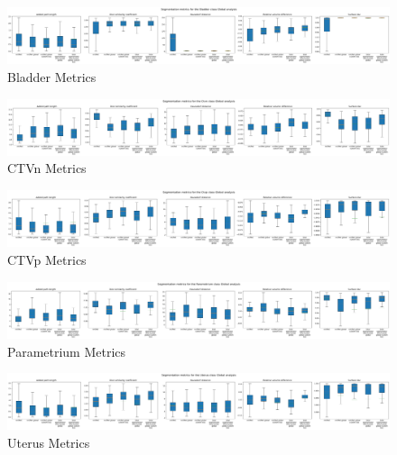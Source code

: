 \documentclass[12pt,twoside]{report}
\begin{document}
\begin{landscape}
  \begin{figure}[H]
    \centering
    \includegraphics[width=\linewidth]{../../research/source/code/data/metrics/metricsbladder_1_combinednotable_Global_analysis.png}
    \caption{Bladder Metrics}\label{fig:region-based-metrics-bladder}
  \end{figure}

  \begin{figure}[H]
    \centering
    \includegraphics[width=\linewidth]{../../research/source/code/data/metrics/metricsctvn_1_combinednotable_Global_analysis.png}
    \caption{CTVn Metrics}\label{fig:region-based-metrics-ctvn}
  \end{figure}

  \begin{figure}[H]
    \centering
    \includegraphics[width=\linewidth]{../../research/source/code/data/metrics/metricsctvp_1_combinednotable_Global_analysis.png}
    \caption{CTVp Metrics}\label{fig:region-based-metrics-ctvp}
  \end{figure}

  \begin{figure}[H]
    \centering
    \includegraphics[width=\linewidth]{../../research/source/code/data/metrics/metricsparametrium_1_combinednotable_Global_analysis.png}
    \caption{Parametrium Metrics}\label{fig:region-based-metrics-parametrium}
  \end{figure}

  \begin{figure}[H]
    \centering
    \includegraphics[width=\linewidth]{../../research/source/code/data/metrics/metricsuterus_1_combinednotable_Global_analysis.png}
    \caption{Uterus Metrics}\label{fig:region-based-metrics-uterus}
  \end{figure}


\end{landscape}
\end{document}
